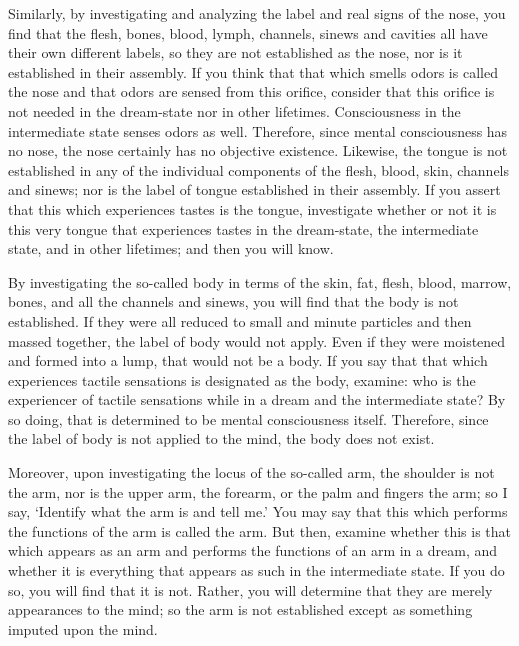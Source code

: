 \documentclass[a4paper,11pt,twoside,final]{book}
\begin{document}
Similarly, by investigating and analyzing the label and real signs of
the nose, you find that the flesh, bones, blood, lymph, channels,
sinews and cavities all have their own different labels, so they are
not established as the nose, nor is it established in their assembly.
If you think that that which smells odors is called the nose and that
odors are sensed from this orifice, consider that this orifice is not
needed in the dream-state nor in other lifetimes. Consciousness in the
intermediate state senses odors as well. Therefore, since mental
consciousness has no nose, the nose certainly has no objective
existence.  Likewise, the tongue is not established in any of the
individual components of the flesh, blood, skin, channels and sinews;
nor is the label of tongue established in their assembly. If you
assert that this which experiences tastes is the tongue, investigate
whether or not it is this very tongue that experiences tastes in the
dream-state, the intermediate state, and in other lifetimes; and then
you will know.

By investigating the so-called body in terms of the skin, fat, flesh,
blood, marrow, bones, and all the channels and sinews, you will find
that the body is not established. If they were all reduced to small
and minute particles and then massed together, the label of body would
not apply. Even if they were moistened and formed into a lump, that
would not be a body. If you say that that which experiences tactile
sensations is designated as the body, examine: who is the experiencer
of tactile sensations while in a dream and the intermediate state? By
so doing, that is determined to be mental consciousness
itself. Therefore, since the label of body is not applied to the mind,
the body does not exist.

Moreover, upon investigating the locus of the so-called arm, the
shoulder is not the arm, nor is the upper arm, the forearm, or the
palm and fingers the arm; so I say, `Identify what the arm is and tell
me.' You may say that this which performs the functions of the arm is
called the arm. But then, examine whether this is that which appears
as an arm and performs the functions of an arm in a dream, and whether
it is everything that appears as such in the intermediate state. If
you do so, you will find that it is not. Rather, you will determine
that they are merely appearances to the mind; so the arm is not
established except as something imputed upon the mind.
\end{document}
